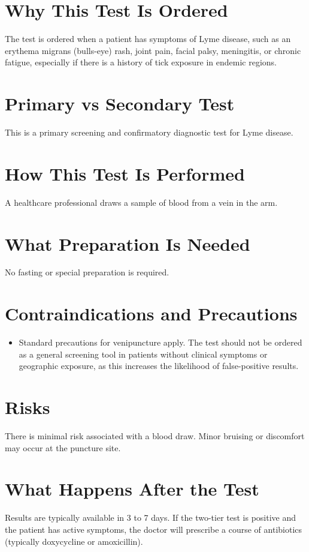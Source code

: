 \section*{Why This Test Is Ordered}
The test is ordered when a patient has symptoms of Lyme disease, such as an erythema migrans (bulls-eye) rash, joint pain, facial palsy, meningitis, or chronic fatigue, especially if there is a history of tick exposure in endemic regions.

\section*{Primary vs Secondary Test}
This is a primary screening and confirmatory diagnostic test for Lyme disease.

\section*{How This Test Is Performed}
A healthcare professional draws a sample of blood from a vein in the arm.

\section*{What Preparation Is Needed}
No fasting or special preparation is required.

\section*{Contraindications and Precautions}
\begin{itemize}
  \item Standard precautions for venipuncture apply. The test should not be ordered as a general screening tool in patients without clinical symptoms or geographic exposure, as this increases the likelihood of false-positive results.
\end{itemize}
\section*{Risks}
There is minimal risk associated with a blood draw. Minor bruising or discomfort may occur at the puncture site.

\section*{What Happens After the Test}
Results are typically available in 3 to 7 days. If the two-tier test is positive and the patient has active symptoms, the doctor will prescribe a course of antibiotics (typically doxycycline or amoxicillin).

